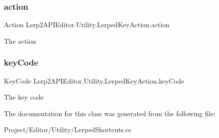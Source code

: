 \subsubsection{\texorpdfstring{action}{action}}
{\footnotesize\ttfamily Action Lerp2\+A\+P\+I\+Editor.\+Utility.\+Lerped\+Key\+Action.\+action}



The action 

\mbox{\label{class_lerp2_a_p_i_editor_1_1_utility_1_1_lerped_key_action_a30cbfef41ad0f5739a249a06848672b2}} 
\subsubsection{\texorpdfstring{key\+Code}{keyCode}}
{\footnotesize\ttfamily Key\+Code Lerp2\+A\+P\+I\+Editor.\+Utility.\+Lerped\+Key\+Action.\+key\+Code}



The key code 



The documentation for this class was generated from the following file\+:\begin{DoxyCompactItemize}
\item 
Project/\+Editor/\+Utility/Lerped\+Shortcuts.\+cs\end{DoxyCompactItemize}
